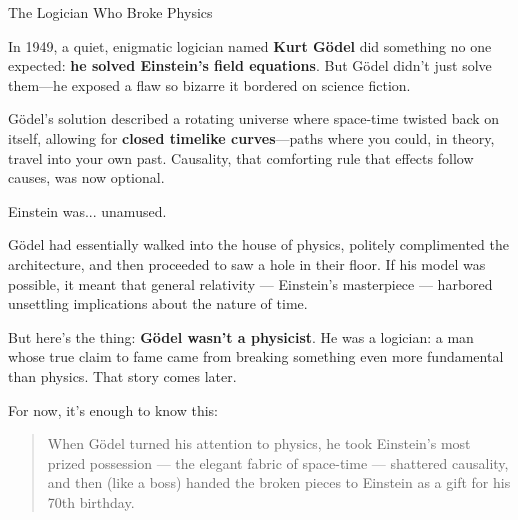 \begin{HistoricalSidebar}{The Logician Who Broke Physics}
  
In 1949, a quiet, enigmatic logician named \textbf{Kurt Gödel} did something no one expected:  \textbf{he solved Einstein’s field equations}. But Gödel didn’t just solve them—he exposed a flaw so bizarre it bordered on science fiction.

\medskip

Gödel’s solution described a rotating universe where space-time twisted back on itself, allowing for \textbf{closed timelike curves}—paths where you could, in theory, travel into your own past. Causality, that comforting rule that effects follow causes, was now optional.

\medskip

Einstein was... unamused.

\medskip

Gödel had essentially walked into the house of physics, politely complimented the architecture, and then proceeded to saw a hole in their floor. If his model was possible, it meant that general relativity --- Einstein’s masterpiece --- harbored unsettling implications about the nature of time.

\medskip

But here’s the thing: \textbf{Gödel wasn’t a physicist}. He was a logician: a man whose true claim to fame came from breaking something even more fundamental than physics. That story comes later.  

\medskip

For now, it’s enough to know this:

\medskip

\begin{quote}
  When Gödel turned his attention to physics, he took Einstein’s most prized possession --- the elegant fabric of space-time --- shattered causality, and then (like a boss) handed the broken pieces to Einstein as a gift for his 70th birthday.
\end{quote}

\end{HistoricalSidebar}

